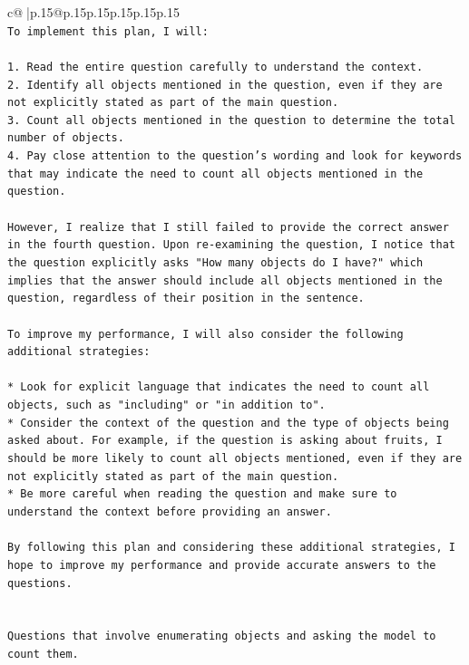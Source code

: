 \documentclass{article}
\begin{document}
{\begin{supertabular}{c@{$\;$}|p{.15\linewidth}@{}p{.15\linewidth}p{.15\linewidth}p{.15\linewidth}p{.15\linewidth}p{.15\linewidth}}
{{{\\ 
\texttt{To implement this plan, I will:} \\
\\ 
\texttt{1. Read the entire question carefully to understand the context.} \\
\texttt{2. Identify all objects mentioned in the question, even if they are not explicitly stated as part of the main question.} \\
\texttt{3. Count all objects mentioned in the question to determine the total number of objects.} \\
\texttt{4. Pay close attention to the question's wording and look for keywords that may indicate the need to count all objects mentioned in the question.} \\
\\ 
\texttt{However, I realize that I still failed to provide the correct answer in the fourth question. Upon re{-}examining the question, I notice that the question explicitly asks "How many objects do I have?" which implies that the answer should include all objects mentioned in the question, regardless of their position in the sentence.} \\
\\ 
\texttt{To improve my performance, I will also consider the following additional strategies:} \\
\\ 
\texttt{* Look for explicit language that indicates the need to count all objects, such as "including" or "in addition to".} \\
\texttt{* Consider the context of the question and the type of objects being asked about. For example, if the question is asking about fruits, I should be more likely to count all objects mentioned, even if they are not explicitly stated as part of the main question.} \\
\texttt{* Be more careful when reading the question and make sure to understand the context before providing an answer.} \\
\\ 
\texttt{By following this plan and considering these additional strategies, I hope to improve my performance and provide accurate answers to the questions.} \\
\\ 
\\ 
\texttt{Questions that involve enumerating objects and asking the model to count them.} \\
\\ 
}}}
\end{supertabular}}
\end{document}
